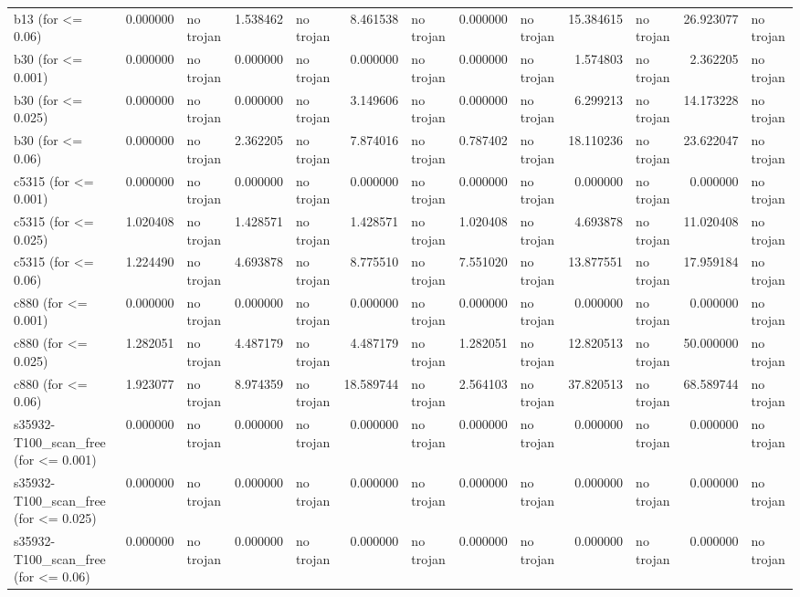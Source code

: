 \begin{tabular}{lrlrlrlrlrlrl}
b13
(for <= 0.06) & 0.000000 & no trojan & 1.538462 & no trojan & 8.461538 & no trojan & 0.000000 & no trojan & 15.384615 & no trojan & 26.923077 & no trojan \\
b30
(for <= 0.001) & 0.000000 & no trojan & 0.000000 & no trojan & 0.000000 & no trojan & 0.000000 & no trojan & 1.574803 & no trojan & 2.362205 & no trojan \\
b30
(for <= 0.025) & 0.000000 & no trojan & 0.000000 & no trojan & 3.149606 & no trojan & 0.000000 & no trojan & 6.299213 & no trojan & 14.173228 & no trojan \\
b30
(for <= 0.06) & 0.000000 & no trojan & 2.362205 & no trojan & 7.874016 & no trojan & 0.787402 & no trojan & 18.110236 & no trojan & 23.622047 & no trojan \\
c5315
(for <= 0.001) & 0.000000 & no trojan & 0.000000 & no trojan & 0.000000 & no trojan & 0.000000 & no trojan & 0.000000 & no trojan & 0.000000 & no trojan \\
c5315
(for <= 0.025) & 1.020408 & no trojan & 1.428571 & no trojan & 1.428571 & no trojan & 1.020408 & no trojan & 4.693878 & no trojan & 11.020408 & no trojan \\
c5315
(for <= 0.06) & 1.224490 & no trojan & 4.693878 & no trojan & 8.775510 & no trojan & 7.551020 & no trojan & 13.877551 & no trojan & 17.959184 & no trojan \\
c880
(for <= 0.001) & 0.000000 & no trojan & 0.000000 & no trojan & 0.000000 & no trojan & 0.000000 & no trojan & 0.000000 & no trojan & 0.000000 & no trojan \\
c880
(for <= 0.025) & 1.282051 & no trojan & 4.487179 & no trojan & 4.487179 & no trojan & 1.282051 & no trojan & 12.820513 & no trojan & 50.000000 & no trojan \\
c880
(for <= 0.06) & 1.923077 & no trojan & 8.974359 & no trojan & 18.589744 & no trojan & 2.564103 & no trojan & 37.820513 & no trojan & 68.589744 & no trojan \\
s35932-T100_scan_free
(for <= 0.001) & 0.000000 & no trojan & 0.000000 & no trojan & 0.000000 & no trojan & 0.000000 & no trojan & 0.000000 & no trojan & 0.000000 & no trojan \\
s35932-T100_scan_free
(for <= 0.025) & 0.000000 & no trojan & 0.000000 & no trojan & 0.000000 & no trojan & 0.000000 & no trojan & 0.000000 & no trojan & 0.000000 & no trojan \\
s35932-T100_scan_free
(for <= 0.06) & 0.000000 & no trojan & 0.000000 & no trojan & 0.000000 & no trojan & 0.000000 & no trojan & 0.000000 & no trojan & 0.000000 & no trojan \\

\end{tabular}
